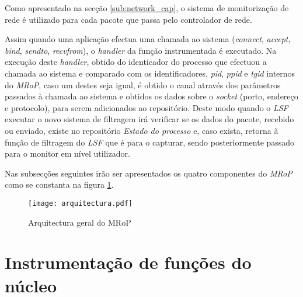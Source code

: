 Como apresentado na secção \ref{sub:network_cap}, o sistema de monitorização de rede é utilizado para cada pacote que passa pelo controlador de rede.

Assim quando uma aplicação efectua uma chamada ao sistema (\textit{connect}, \textit{accept}, \textit{bind}, \textit{sendto}, \textit{recvfrom}), o \textit{handler} da função instrumentada é executado.
Na execução deste \textit{handler}, obtido do identicador do processo que efectuou a chamada ao sistema e comparado com os identificadores, \textit{pid}, \textit{ppid} e \textit{tgid} internos do \textit{MRoP}, caso um destes seja igual, é obtido o canal através dos parâmetros passados à chamada ao sistema e obtidos os dados sobre o \textit{socket} (porto, endereço e protocolo), para serem adicionados ao repositório.
Deste modo quando o \textit{LSF} executar o novo sistema de filtragem irá verificar se os dados do pacote, recebido ou enviado, existe no repositório \textit{Estado do processo} e, caso exista, retorna à função de filtragem do \textit{LSF} que é para o capturar, sendo posteriormente passado para o monitor em nível utilizador.




Nas subsecções seguintes irão ser apresentados os quatro componentes do \textit{MRoP} como se constanta na figura \ref{fig:general_architecture}.

\begin{figure}[!htbp]
\centering
\texttt{[image: arquitectura.pdf]}
\caption{Arquitectura geral do MRoP}
\label{fig:general_architecture}
\end{figure}



\section{Instrumentação de funções do núcleo}




